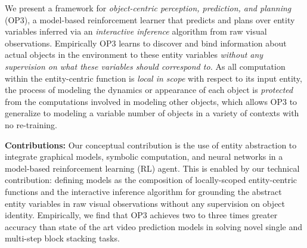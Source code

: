We present a framework for \textit{object-centric perception, prediction, and planning} (OP3), a model-based reinforcement learner that predicts and plans over entity variables inferred via an \textit{interactive inference} algorithm from raw visual observations.
Empirically OP3 learns to discover and bind information about actual objects in the environment to these entity variables \textit{without any supervision on what these variables should correspond to.}
As all computation within the entity-centric function is \textit{local in scope} with respect to its input entity, the process of modeling the dynamics or appearance of each object is \textit{protected} from the computations involved in modeling other objects, which allows OP3 to generalize to modeling a variable number of objects in a variety of contexts with no re-training.

\textbf{Contributions:} 
Our conceptual contribution is the use of entity abstraction to integrate graphical models, symbolic computation, and neural networks in a model-based reinforcement learning (RL) agent.
This is enabled by our technical contribution: defining models as the composition of locally-scoped entity-centric functions and the interactive inference algorithm for grounding the abstract entity variables in raw visual observations without any supervision on object identity.
Empirically, we find that OP3 achieves two to three times greater accuracy than state of the art video prediction models in solving novel single and multi-step block stacking tasks.